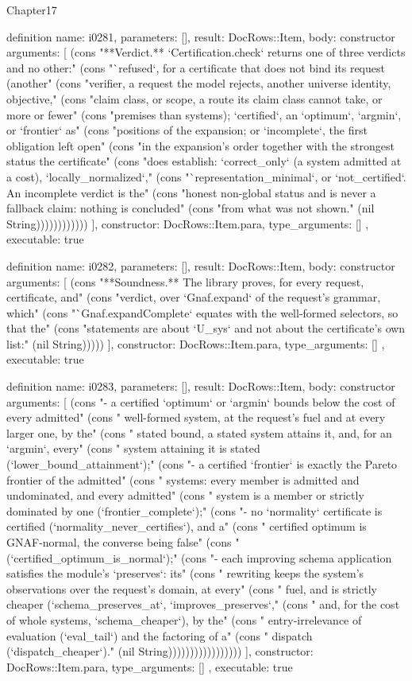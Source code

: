 \begin{lexlean}{Chapter17}
\begin{semanticmodule}
definition{
  name: i0281,
  parameters: [],
  result: DocRows::Item,
  body: constructor{
    arguments: [
      (cons "**Verdict.** `Certification.check` returns one of three verdicts and no other:" (cons "`refused`, for a certificate that does not bind its request (another" (cons "verifier, a request the model rejects, another universe identity, objective," (cons "claim class, or scope, a route its claim class cannot take, or more or fewer" (cons "premises than systems); `certified`, an `optimum`, `argmin`, or `frontier` as" (cons "positions of the expansion; or `incomplete`, the first obligation left open" (cons "in the expansion's order together with the strongest status the certificate" (cons "does establish: `correct_only` (a system admitted at a cost), `locally_normalized`," (cons "`representation_minimal`, or `not_certified`. An incomplete verdict is the" (cons "honest non-global status and is never a fallback claim: nothing is concluded" (cons "from what was not shown." (nil String))))))))))))
    ],
    constructor: DocRows::Item.para,
    type_arguments: []
  },
  executable: true
}

definition{
  name: i0282,
  parameters: [],
  result: DocRows::Item,
  body: constructor{
    arguments: [
      (cons "**Soundness.** The library proves, for every request, certificate, and" (cons "verdict, over `Gnaf.expand` of the request's grammar, which" (cons "`Gnaf.expandComplete` equates with the well-formed selectors, so that the" (cons "statements are about `U_sys` and not about the certificate's own list:" (nil String)))))
    ],
    constructor: DocRows::Item.para,
    type_arguments: []
  },
  executable: true
}

definition{
  name: i0283,
  parameters: [],
  result: DocRows::Item,
  body: constructor{
    arguments: [
      (cons "- a certified `optimum` or `argmin` bounds below the cost of every admitted" (cons "  well-formed system, at the request's fuel and at every larger one, by the" (cons "  stated bound, a stated system attains it, and, for an `argmin`, every" (cons "  system attaining it is stated (`lower_bound_attainment`);" (cons "- a certified `frontier` is exactly the Pareto frontier of the admitted" (cons "  systems: every member is admitted and undominated, and every admitted" (cons "  system is a member or strictly dominated by one (`frontier_complete`);" (cons "- no `normality` certificate is certified (`normality_never_certifies`), and a" (cons "  certified optimum is GNAF-normal, the converse being false" (cons "  (`certified_optimum_is_normal`);" (cons "- each improving schema application satisfies the module's `preserves`: its" (cons "  rewriting keeps the system's observations over the request's domain, at every" (cons "  fuel, and is strictly cheaper (`schema_preserves_at`, `improves_preserves`," (cons "  and, for the cost of whole systems, `schema_cheaper`), by the" (cons "  entry-irrelevance of evaluation (`eval_tail`) and the factoring of a" (cons "  dispatch (`dispatch_cheaper`)." (nil String)))))))))))))))))
    ],
    constructor: DocRows::Item.para,
    type_arguments: []
  },
  executable: true
}


\end{semanticmodule}
\end{lexlean}
